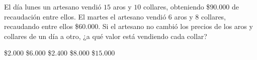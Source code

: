 \documentclass[
  titulo=Prueba,
  subtitulo=Álgebra y funciones,
  curso=Tercero medio A,
  fecha=2025-09-23,
  con nombre,
  ppp=1
]{srs3}
\begin{document}
\begin{preguntas}
\pregunta El día lunes un artesano vendió \(15\) aros y \(10\) collares, obteniendo \$$90.000$ de recaudación entre ellos. El martes el artesano vendió \(6\) aros y \(8\) collares, recaudando entre ellos \$$60.000$. Si el artesano no cambió los precios de los aros y collares de un día a otro, ¿a qué valor está vendiendo cada collar?
\begin{alternativas}
\alternativa \$$2.000$
\alternativa \$$6.000$
\alternativa \$$2.400$
\alternativa \$$8.000$
\alternativa \$$15.000$
\end{alternativas}
%

\end{preguntas}
\end{document}
